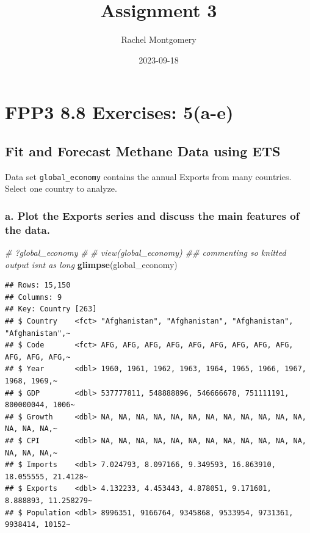 \documentclass[
]{article}
\title{Assignment 3}
\author{Rachel Montgomery}
\date{2023-09-18}
\newenvironment{Shaded}{\begin{snugshade}}{\end{snugshade}}
\newcommand{\CommentTok}[1]{\textcolor[rgb]{0.56,0.35,0.01}{\textit{#1}}}
\newcommand{\FunctionTok}[1]{\textcolor[rgb]{0.13,0.29,0.53}{\textbf{#1}}}
\newcommand{\NormalTok}[1]{#1}
\begin{document}
\maketitle

\hypertarget{fpp3-8.8-exercises-5a-e}{%
\section{FPP3 8.8 Exercises: 5(a-e)}\label{fpp3-8.8-exercises-5a-e}}

\hypertarget{fit-and-forecast-methane-data-using-ets}{%
\subsection{Fit and Forecast Methane Data using
ETS}\label{fit-and-forecast-methane-data-using-ets}}

Data set \texttt{global\_economy} contains the annual Exports from many
countries. Select one country to analyze.

\hypertarget{a.-plot-the-exports-series-and-discuss-the-main-features-of-the-data.}{%
\subsubsection{a. Plot the Exports series and discuss the main features
of the
data.}\label{a.-plot-the-exports-series-and-discuss-the-main-features-of-the-data.}}

\begin{Shaded}
\begin{Highlighting}[]
\CommentTok{\# ?global\_economy}
\CommentTok{\# }
\CommentTok{\# view(global\_economy) \#\# commenting so knitted output isn\textquotesingle{}t as long }
\FunctionTok{glimpse}\NormalTok{(global\_economy)}
\end{Highlighting}
\end{Shaded}

\begin{verbatim}
## Rows: 15,150
## Columns: 9
## Key: Country [263]
## $ Country    <fct> "Afghanistan", "Afghanistan", "Afghanistan", "Afghanistan",~
## $ Code       <fct> AFG, AFG, AFG, AFG, AFG, AFG, AFG, AFG, AFG, AFG, AFG, AFG,~
## $ Year       <dbl> 1960, 1961, 1962, 1963, 1964, 1965, 1966, 1967, 1968, 1969,~
## $ GDP        <dbl> 537777811, 548888896, 546666678, 751111191, 800000044, 1006~
## $ Growth     <dbl> NA, NA, NA, NA, NA, NA, NA, NA, NA, NA, NA, NA, NA, NA, NA,~
## $ CPI        <dbl> NA, NA, NA, NA, NA, NA, NA, NA, NA, NA, NA, NA, NA, NA, NA,~
## $ Imports    <dbl> 7.024793, 8.097166, 9.349593, 16.863910, 18.055555, 21.4128~
## $ Exports    <dbl> 4.132233, 4.453443, 4.878051, 9.171601, 8.888893, 11.258279~
## $ Population <dbl> 8996351, 9166764, 9345868, 9533954, 9731361, 9938414, 10152~
\end{verbatim}
\end{document}
